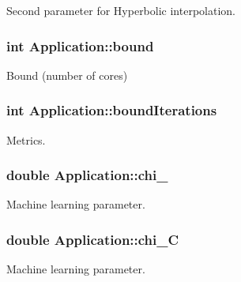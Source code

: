 Second parameter for Hyperbolic interpolation. 

\hypertarget{classApplication_a6e91bef9d503af0e8ba38c8f445c8cb0}{
\subsubsection[{bound}]{\setlength{\rightskip}{0pt plus 5cm}int Application\-::bound}}\label{classApplication_a6e91bef9d503af0e8ba38c8f445c8cb0}


Bound (number of cores) 

\hypertarget{classApplication_a6a3692743eccba602a58fdfc3f23950b}{
\subsubsection[{bound\-Iterations}]{\setlength{\rightskip}{0pt plus 5cm}int Application\-::bound\-Iterations}}\label{classApplication_a6a3692743eccba602a58fdfc3f23950b}


Metrics. 

\hypertarget{classApplication_a3b9dab40d189989c836b8d328946bbb6}{
\subsubsection[{chi\-\_\-0}]{\setlength{\rightskip}{0pt plus 5cm}double Application\-::chi\-\_}}\label{classApplication_a3b9dab40d189989c836b8d328946bbb6}


Machine learning parameter. 

\hypertarget{classApplication_a46e29a6bfc74de610feec809a77dfb62}{
\subsubsection[{chi\-\_\-\-C}]{\setlength{\rightskip}{0pt plus 5cm}double Application\-::chi\-\_\-\-C}}\label{classApplication_a46e29a6bfc74de610feec809a77dfb62}


Machine learning parameter. 

